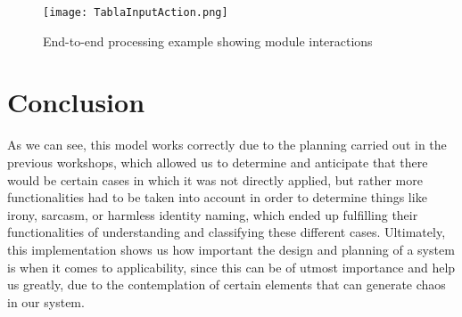 \documentclass[conference]{IEEEtran}
\begin{document}
\begin{figure}[h]
    \centering
    \texttt{[image: TablaInputAction.png]}
    \caption{End-to-end processing example showing module interactions}
    \label{fig:interaction_example}
\end{figure}

\section{Conclusion}
As we can see, this model works correctly due to the planning carried out in the previous workshops, which allowed us to determine and anticipate that there would be certain cases in which it was not directly applied, but rather more functionalities had to be taken into account in order to determine things like irony, sarcasm, or harmless identity naming, which ended up fulfilling their functionalities of understanding and classifying these different cases. Ultimately, this implementation shows us how important the design and planning of a system is when it comes to applicability, since this can be of utmost importance and help us greatly, due to the contemplation of certain elements that can generate chaos in our system.
\end{document}
